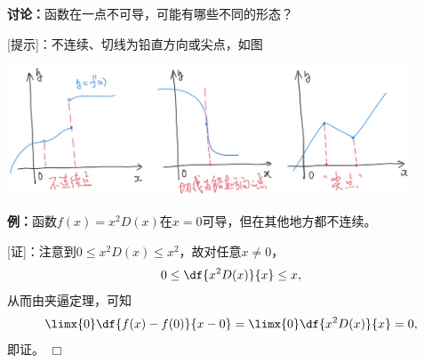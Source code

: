 {\bf 讨论：}函数在一点不可导，可能有哪些不同的形态？

[提示]：不连续、切线为铅直方向或尖点，如图

\begin{center}
	\includegraphics[width=0.9\textwidth]{./images/ch2/nDeri.jpg}
\end{center}

{\bf 例：}函数$f(x)=x^2D(x)$在$x=0$可导，但在其他地方都不连续。

[证]：注意到$0\leq x^2D(x)\leq x^2$，故对任意$x\ne 0$，
$$0\leq \df{x^2D(x)}{x}\leq x,$$
从而由夹逼定理，可知
$$\limx{0}\df{f(x)-f(0)}{x-0}=\limx{0}\df{x^2D(x)}{x}=0,$$
即证。
\hfill$\Box$

